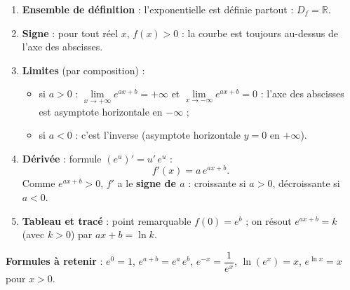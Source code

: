 \documentclass[11pt]{article}
\newcommand{\cle}[1]{{\popxbold\color{popdark}#1}}
\begin{document}
\begin{methode}[Plan d'étude de $f(x)=e^{ax+b}$, $a\neq 0$]
\begin{enumerate}
\item \textbf{Ensemble de définition} : l'exponentielle est définie partout : $D_f=\mathbb{R}$.
\item \textbf{Signe} : pour tout réel $x$, $f(x)>0$ : la courbe est toujours \cle{au-dessus} de l'axe des abscisses.
\item \textbf{Limites} (par composition) :
\begin{itemize}
\item si $a>0$ : $\lim\limits_{x\to+\infty} e^{ax+b}=+\infty$ et $\lim\limits_{x\to-\infty} e^{ax+b}=0$ : l'axe des abscisses est \cle{asymptote horizontale} en $-\infty$ ;
\item si $a<0$ : c'est l'inverse (asymptote horizontale $y=0$ en $+\infty$).
\end{itemize}
\item \textbf{Dérivée} : formule $(e^u)'=u'\,e^u$ :
\[
f'(x)=a\,e^{ax+b}.
\]
Comme $e^{ax+b}>0$, $f'$ a le \textbf{signe de $a$} : croissante si $a>0$, décroissante si $a<0$.
\item \textbf{Tableau et tracé} : point remarquable $f(0)=e^{b}$ ; on résout $e^{ax+b}=k$ (avec $k>0$) par $ax+b=\ln k$.
\end{enumerate}
\textbf{Formules à retenir} : $e^0=1$, $e^{a+b}=e^a\,e^b$, $e^{-x}=\dfrac{1}{e^x}$, $\ln(e^x)=x$, $e^{\ln x}=x$ pour $x>0$.
\end{methode}
\end{document}
